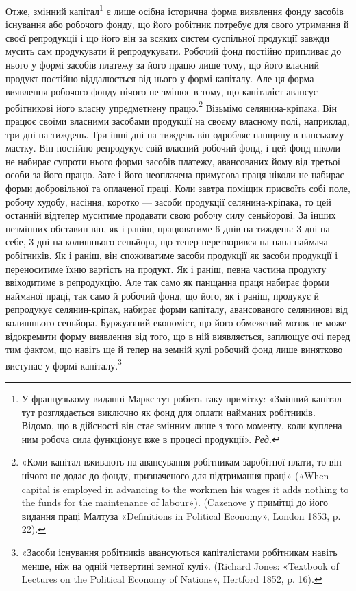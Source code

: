 Отже, змінний капітал\footnote*{
У французькому виданні Маркс тут робить таку примітку: «Змінний
капітал тут розглядається виключно як фонд для оплати найманих
робітників. Відомо, що в дійсності він стає змінним лише з того моменту,
коли куплена ним робоча сила функціонує вже в процесі продукції».
\emph{Ред.}
} є лише осібна історична форма виявлення
фонду засобів існування або робочого фонду, що його
робітник потребує для свого утримання й своєї репродукції і
що його він за всяких систем суспільної продукції завжди мусить
сам продукувати й репродукувати. Робочий фонд постійно
припливає до нього у формі засобів платежу за його працю лише
тому, що його власний продукт постійно віддалюється від нього
у формі капіталу. Але ця форма виявлення робочого фонду нічого
не змінює в тому, що капіталіст авансує робітникові його
власну упредметнену працю.\footnote{
«Коли капітал вживають на авансування робітникам заробітної
плати, то він нічого не додає до фонду, призначеного для підтримання
праці» («When capital is employed in advancing to the workmen his wages
it adds nothing to the funds for the maintenance of labour»). (Cazenove
у примітці до його видання праці Малтуза «Definitions in Political Economy»,
London 1853, p. 22).
} Візьмімо селянина-кріпака. Він
працює своїми власними засобами продукції на своєму власному
полі, наприклад, три дні на тиждень. Три інші дні на тиждень
він одробляє панщину в панському маєтку. Він постійно репродукує
свій власний робочий фонд, і цей фонд ніколи не набирає
супроти нього форми засобів платежу, авансованих йому
від третьої особи за його працю. Зате і його неоплачена примусова
праця ніколи не набирає форми добровільної та оплаченої
праці. Коли завтра поміщик присвоїть собі поле, робочу худобу,
насіння, коротко — засоби продукції селянина-кріпака,
то цей останній відтепер муситиме продавати свою робочу силу
сеньйорові. За інших незмінних обставин він, як і раніш, працюватиме
6 днів на тиждень: 3 дні на себе, 3 дні на колишнього
сеньйора, що тепер перетворився на пана-наймача робітників.
Як і раніш, він споживатиме засоби продукції як засоби продукції
і переноситиме їхню вартість на продукт. Як і раніш, певна
частина продукту ввіходитиме в репродукцію. Але так само як
панщанна праця набирає форми найманої праці, так само й робочий
фонд, що його, як і раніш, продукує й репродукує селянин-кріпак,
набирає форми капіталу, авансованого селянинові від
колишнього сеньйора. Буржуазний економіст, що його обмежений
мозок не може відокремити форму виявлення від того, що
в ній виявляється, заплющує очі перед тим фактом, що навіть
ще й тепер на земній кулі робочий фонд лише винятково виступає
у формі капіталу.\footnote{
«Засоби існування робітників авансуються капіталістами робітникам
навіть менше, ніж на одній четвертині земної кулі». (Richard
Jones: «Textbook of Lectures on the Political Economy of Nations», Hertford
1852, p. 16).
}


